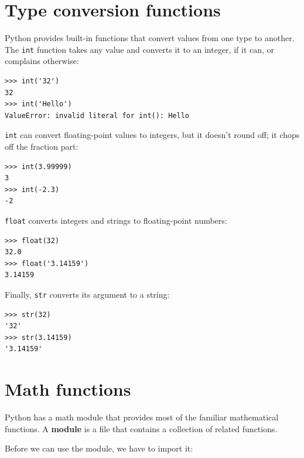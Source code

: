 \documentclass[10pt]{book}
\begin{document}
\section{Type conversion functions}



Python provides built-in functions that convert values
from one type to another.  The {\tt int} function takes any value and
converts it to an integer, if it can, or complains otherwise:

\begin{verbatim}
>>> int('32')
32
>>> int('Hello')
ValueError: invalid literal for int(): Hello
\end{verbatim}
%
{\tt int} can convert floating-point values to integers, but it
doesn't round off; it chops off the fraction part:

\begin{verbatim}
>>> int(3.99999)
3
>>> int(-2.3)
-2
\end{verbatim}
%
{\tt float} converts integers and strings to floating-point
numbers:

\begin{verbatim}
>>> float(32)
32.0
>>> float('3.14159')
3.14159
\end{verbatim}
%
Finally, {\tt str} converts its argument to a string:

\begin{verbatim}
>>> str(32)
'32'
>>> str(3.14159)
'3.14159'
\end{verbatim}
%



\section{Math functions}

Python has a math module that provides most of the familiar
mathematical functions.  A {\bf module} is a file that contains a
collection of related functions.

Before we can use the module, we have to import it:
\end{document}
